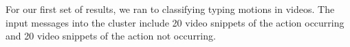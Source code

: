 For our first set of results, we ran to classifying typing motions in videos.
The input messages into the cluster include 20 video snippets of the action
occurring and 20 video snippets of the action not occurring.
%

